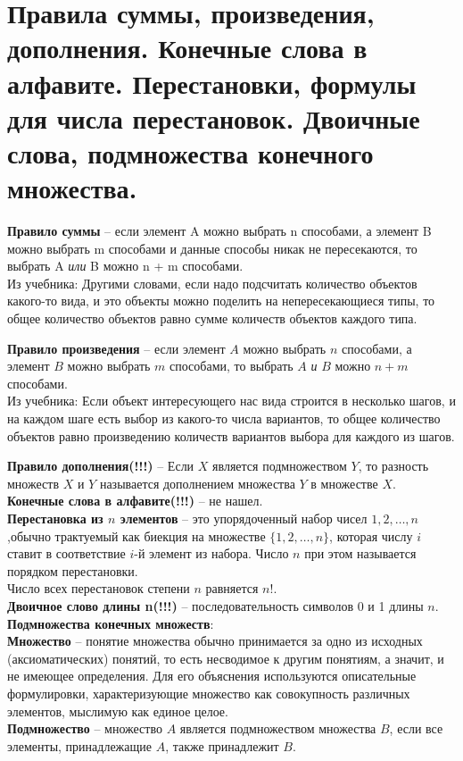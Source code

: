 \section{Правила суммы, произведения, дополнения. Конечные слова в алфавите. Перестановки, формулы для числа перестановок. Двоичные слова, подмножества конечного множества.}

\textbf{Правило суммы} -- если элемент A можно выбрать n способами, а элемент B можно выбрать m способами и данные способы никак не пересекаются, то выбрать A \textit{или} B можно n + m способами. \\
Из учебника: Другими словами, если надо подсчитать количество объектов какого-то вида,
и это объекты можно поделить на непересекающиеся типы, то общее количество
объектов равно сумме количеств объектов каждого типа.

\textbf{Правило произведения} -- если элемент $A$ можно выбрать $n$ способами, а элемент $B$ можно выбрать $m$ способами, то выбрать $A$ \textit{и} $B$ можно $n + m$ способами. \\
Из учебника: Если объект интересующего нас вида строится в несколько шагов, и на каждом шаге есть выбор из какого-то числа вариантов, то общее количество объектов равно произведению количеств вариантов выбора для каждого из шагов. 

\textbf{Правило дополнения(!!!)} -- Если $X$ является подмножеством $Y$, то разность множеств $X$ и $Y$ называется дополнением множества $Y$ в множестве $X$. \\

\textbf{Конечные слова в алфавите(!!!)} -- не нашел.\\

\textbf{Перестановка из $n$ элементов} --  это упорядоченный набор чисел $1,2, \ldots, n$,обычно трактуемый как биекция на множестве $\{1, 2, \ldots, n\}$, которая числу $i$ ставит в соответствие $i$-й элемент из набора. Число $n$ при этом называется порядком перестановки. \\
Число всех перестановок степени $n$ равняется $n!$.\\


\textbf{Двоичное слово длины n(!!!)} -- последовательность символов 0 и 1 длины $n$. \\

\textbf{Подмножества конечных множеств}: \\
\textbf{Множество} -- понятие множества обычно принимается за одно из исходных (аксиоматических) понятий, то есть несводимое к другим понятиям, а значит, и не имеющее определения. Для его объяснения используются описательные формулировки, характеризующие множество как совокупность различных элементов, мыслимую как единое целое. \\
\textbf{Подмножество} -- множество $A$ является подмножеством множества $B$, если все элементы, принадлежащие $A$, также принадлежит $B$.

